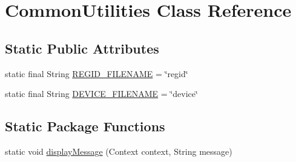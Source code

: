 \hypertarget{classcom_1_1axcoto_1_1shinjuku_1_1sushi_1_1_common_utilities}{\section{\-Common\-Utilities \-Class \-Reference}
\label{classcom_1_1axcoto_1_1shinjuku_1_1sushi_1_1_common_utilities}
}
\subsection*{\-Static \-Public \-Attributes}
\begin{DoxyCompactItemize}
\item 
static final \-String \hyperlink{classcom_1_1axcoto_1_1shinjuku_1_1sushi_1_1_common_utilities_aa8ee6c89d27f7a01ecae7f8371873abd}{\-R\-E\-G\-I\-D\-\_\-\-F\-I\-L\-E\-N\-A\-M\-E} = \char`\"{}regid\char`\"{}
\item 
static final \-String \hyperlink{classcom_1_1axcoto_1_1shinjuku_1_1sushi_1_1_common_utilities_a8dc5249305626e68b7e27ca3164f369c}{\-D\-E\-V\-I\-C\-E\-\_\-\-F\-I\-L\-E\-N\-A\-M\-E} = \char`\"{}device\char`\"{}
\end{DoxyCompactItemize}
\subsection*{\-Static \-Package \-Functions}
\begin{DoxyCompactItemize}
\item 
static void \hyperlink{classcom_1_1axcoto_1_1shinjuku_1_1sushi_1_1_common_utilities_a1954ce8378d13de06ad55abb4cac1d36}{display\-Message} (\-Context context, \-String message)
\end{DoxyCompactItemize}
